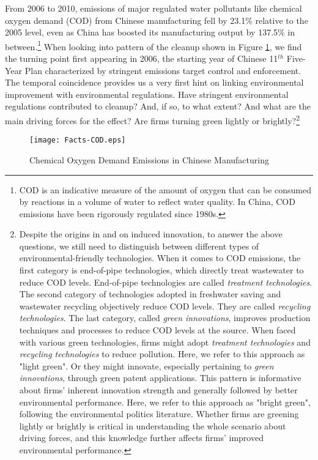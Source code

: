 \documentclass[12pt,english]{article}
\begin{document}
From 2006 to 2010, emissions of major regulated water pollutants like chemical oxygen demand (COD) from Chinese manufacturing fell by 23.1$\%$ relative to the 2005 level, even as China has boosted its manufacturing output by 137.5$\%$ in between.\footnote{COD is an indicative measure of the amount of oxygen that can be consumed by reactions in a volume of water to reflect water quality. In China, COD emissions have been rigorously regulated since 1980s.} When looking into pattern of the cleanup shown in Figure \ref{fig:COD emissions}, we find the turning point first appearing in 2006, the starting year of Chinese 11$^{th}$ Five-Year Plan characterized by stringent emissions target control and enforcement. The temporal coincidence provides us a very first hint on linking environmental improvement with environmental regulations. Have stringent environmental regulations contributed to cleanup? And, if so, to what extent? And what are the main driving forces for the effect? Are firms turning green lightly or brightly?\footnote{Despite the origins in \citet*{hicks1963theory} and \citet*{porter1991american} on induced innovation, to answer the above questions, we still need to distinguish between different types of environmental-friendly technologies. When it comes to COD emissions, the first category is end-of-pipe technologies, which directly treat wastewater to reduce COD levels. End-of-pipe technologies are called \textit{treatment technologies}. The second category of technologies adopted in freshwater saving and wastewater recycling objectively reduce COD levels. They are called \textit{recycling technologies}. The last category, called \textit{green innovations}, improves production techniques and processes to reduce COD levels at the source. When faced with various green technologies, firms might adopt \textit{treatment technologies} and \textit{recycling technologies} to reduce pollution. Here, we refer to this approach as "light green". Or they might innovate, especially pertaining to \textit{green innovations}, through green patent applications. This pattern is informative about firms' inherent innovation strength and generally followed by better environmental performance. Here, we refer to this approach as "bright green", following the environmental politics literature. Whether firms are greening lightly or brightly is critical in understanding the whole scenario about driving forces, and this knowledge further affects firms' improved environmental performance.}

\begin{figure}[htbp]
	\caption{Chemical Oxygen Demand Emissions in Chinese Manufacturing}
	\label{fig:COD emissions}
	\centering
	\texttt{[image: Facts-COD.eps]}
\end{figure}
\end{document}
